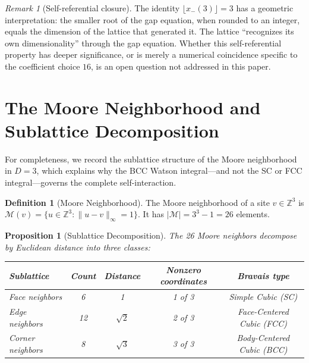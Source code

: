 \documentclass[12pt]{article}
\newtheorem{proposition}[theorem]{Proposition}
\theoremstyle{definition}
\newtheorem{definition}[theorem]{Definition}
\theoremstyle{remark}
\newtheorem{remark}[theorem]{Remark}
\begin{document}
\begin{remark}[Self-referential closure]
The identity $\lfloor x_-(3) \rfloor = 3$ has a geometric interpretation: the smaller root of the gap equation, when rounded to an integer, equals the dimension of the lattice that generated it. The lattice ``recognizes its own dimensionality'' through the gap equation. Whether this self-referential property has deeper significance, or is merely a numerical coincidence specific to the coefficient choice $16$, is an open question not addressed in this paper.
\end{remark}

\section{The Moore Neighborhood and Sublattice Decomposition}
\label{sec:moore}

For completeness, we record the sublattice structure of the Moore neighborhood in $D = 3$, which explains why the BCC Watson integral---and not the SC or FCC integral---governs the complete self-interaction.

\begin{definition}[Moore Neighborhood]
The Moore neighborhood of a site $v \in \mathbb{Z}^3$ is $\mathcal{M}(v) = \{u \in \mathbb{Z}^3 : \|u - v\|_\infty = 1\}$. It has $|\mathcal{M}| = 3^3 - 1 = 26$ elements.
\end{definition}

\begin{proposition}[Sublattice Decomposition]
\label{prop:sublattice}
The 26 Moore neighbors decompose by Euclidean distance into three classes:
\begin{center}
\renewcommand{\arraystretch}{1.3}
\begin{tabular}{@{}lcccc@{}}
\toprule
Sublattice & Count & Distance & Nonzero coordinates & Bravais type \\
\midrule
Face neighbors & 6 & 1 & 1 of 3 & Simple Cubic (SC) \\
Edge neighbors & 12 & $\sqrt{2}$ & 2 of 3 & Face-Centered Cubic (FCC) \\
Corner neighbors & 8 & $\sqrt{3}$ & 3 of 3 & Body-Centered Cubic (BCC) \\
\bottomrule
\end{tabular}
\end{center}
\end{proposition}
\end{document}
